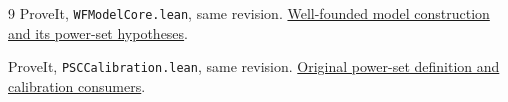 \documentclass[11pt]{article}
\begin{document}
\begin{thebibliography}{9}
ProveIt, \texttt{WFModelCore.lean}, same revision.
\href{https://github.com/VladimirReshetnikov/ProveIt/blob/57541fe0cfe3af62b4cb58747d8d1d7c16b338d5/Computability/BusyBeaver/Lean/BusyBeaver/ZFC/WFModelCore.lean}{Well-founded model construction and its power-set hypotheses}.

ProveIt, \texttt{PSCCalibration.lean}, same revision.
\href{https://github.com/VladimirReshetnikov/ProveIt/blob/57541fe0cfe3af62b4cb58747d8d1d7c16b338d5/Computability/BusyBeaver/Lean/BusyBeaver/ZFC/PSCCalibration.lean}{Original power-set definition and calibration consumers}.
\end{thebibliography}
\end{document}
